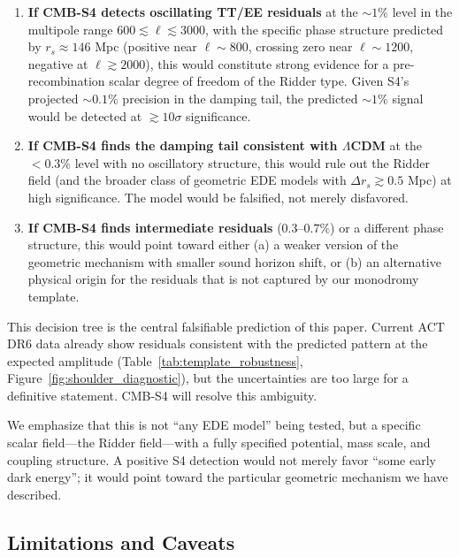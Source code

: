 \documentclass[a4paper,11pt]{article}
\begin{document}
\begin{enumerate}
    \item \textbf{If CMB-S4 detects oscillating TT/EE residuals} at the $\sim 1\%$ level in the multipole range $600 \lesssim \ell \lesssim 3000$, with the specific phase structure predicted by $r_s \approx 146$ Mpc (positive near $\ell \sim 800$, crossing zero near $\ell \sim 1200$, negative at $\ell \gtrsim 2000$), this would constitute strong evidence for a pre-recombination scalar degree of freedom of the Ridder type. Given S4's projected $\sim 0.1\%$ precision in the damping tail, the predicted $\sim 1\%$ signal would be detected at $\gtrsim 10\sigma$ significance.
    
    \item \textbf{If CMB-S4 finds the damping tail consistent with $\Lambda$CDM} at the $< 0.3\%$ level with no oscillatory structure, this would rule out the Ridder field (and the broader class of geometric EDE models with $\Delta r_s \gtrsim 0.5$ Mpc) at high significance. The model would be falsified, not merely disfavored.
    
    \item \textbf{If CMB-S4 finds intermediate residuals} ($0.3$--$0.7\%$) or a different phase structure, this would point toward either (a) a weaker version of the geometric mechanism with smaller sound horizon shift, or (b) an alternative physical origin for the residuals that is not captured by our monodromy template.
\end{enumerate}

This decision tree is the central falsifiable prediction of this paper. Current ACT DR6 data already show residuals consistent with the predicted pattern at the expected amplitude (Table~\ref{tab:template_robustness}, Figure~\ref{fig:shoulder_diagnostic}), but the uncertainties are too large for a definitive statement. CMB-S4 will resolve this ambiguity.

We emphasize that this is not ``any EDE model'' being tested, but a specific scalar field---the Ridder field---with a fully specified potential, mass scale, and coupling structure. A positive S4 detection would not merely favor ``some early dark energy''; it would point toward the particular geometric mechanism we have described.

\subsection*{Limitations and Caveats}
\label{sec:limitations}
\end{document}
